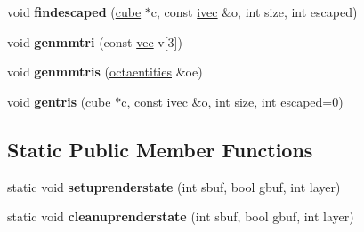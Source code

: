 \begin{DoxyCompactItemize}
\item 
\mbox{\label{structstainrenderer_ac64c815bcb9c05e96ac4be0932b154d2}} 
void {\bfseries findescaped} (\hyperlink{structcube}{cube} $\ast$c, const \hyperlink{structivec}{ivec} \&o, int size, int escaped)
\item 
\mbox{\label{structstainrenderer_a4cc0543c6b2c05a2d3c58f3d1d4d211c}} 
void {\bfseries genmmtri} (const \hyperlink{structvec}{vec} v\mbox{[}3\mbox{]})
\item 
\mbox{\label{structstainrenderer_a3c58aa7bebaa09ccd76b8294e1e2da49}} 
void {\bfseries genmmtris} (\hyperlink{structoctaentities}{octaentities} \&oe)
\item 
\mbox{\label{structstainrenderer_a7317f18d9f1ea9b19c704f0d9adc136b}} 
void {\bfseries gentris} (\hyperlink{structcube}{cube} $\ast$c, const \hyperlink{structivec}{ivec} \&o, int size, int escaped=0)
\end{DoxyCompactItemize}
\subsection*{Static Public Member Functions}
\begin{DoxyCompactItemize}
\item 
\mbox{\label{structstainrenderer_a36ae9c192c3b52b7cf290584385fb1d7}} 
static void {\bfseries setuprenderstate} (int sbuf, bool gbuf, int layer)
\item 
\mbox{\label{structstainrenderer_a28168ee14a546301e0f0bf9bec35d830}} 
static void {\bfseries cleanuprenderstate} (int sbuf, bool gbuf, int layer)
\end{DoxyCompactItemize}
